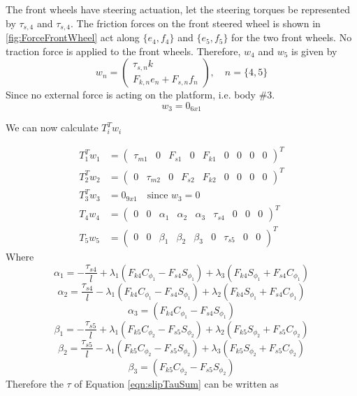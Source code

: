 {The front wheels have steering actuation, let the steering  torques be represented by $\tau_{s,4}$ and  $\tau_{s,4}$. The friction forces on the front steered wheel is shown in \ref{fig:ForceFrontWheel} act along $\{e_4,f_4\}$ and $\{e_5,f_5\}$ for the two front wheels. No traction force is applied to the front wheels. Therefore, $w_4$ and $w_5$ is given by
\[ w_n=\begin{pmatrix}
\tau_{s,n}k\\
F_{k,n}e_n+F_{s,n}f_n
\end{pmatrix},  \quad n=\{4,5\}\]
Since no external force is acting on the platform, i.e. body \#3. \[w_3=0_{6x1}\]

We can now calculate $T_i^Tw_i$

\begin{subequations}
	\label{eqn:slip_Tau_is}
	\begin{align}
	T_1^T w_1&=\begin{pmatrix}
	\tau_{m1} & 0 & F_{s1}& 0& F_{k1}&0&0&0&0
	\end{pmatrix} ^T\\
	T_2^T w_2&=\begin{pmatrix}
	0&\tau_{m2}& 0&F_{s2}&  F_{k2}&0&0&0&0
	\end{pmatrix} ^T\\
	T_3^T w_3&=0_{9x1} \quad \text{since } w_3=0\\
	T_4w_4&= \begin{pmatrix}
	0 & 0& \alpha_1& \alpha_2 & \alpha_3 &\tau_{s4}& 0&0 &0
	\end{pmatrix}^T\\
	T_5w_5&=\begin{pmatrix}
	0 & 0& \beta_1& \beta_2 & \beta_3 &0 &\tau_{s5}& 0&0
	\end{pmatrix}^T
	\end{align}
\end{subequations}
Where 
\[\alpha_1=-\frac{\tau_{s4}}{l}+\lambda_1(F_{k4}C_{\phi_1}-F_{s4}S_{\phi_1})+\lambda_3(F_{k4}S_{\phi_1}+F_{s4}C_{\phi_1})\]
\[\alpha_2=\frac{\tau_{s4}}{l}-\lambda_1(F_{k4}C_{\phi_1}-F_{s4}S_{\phi_1})+\lambda_2(F_{k4}S_{\phi_1}+F_{s4}C_{\phi_1})\]
\[\alpha_3=(F_{k4}C_{\phi_1}-F_{s4}S_{\phi_1})\]
\[\beta_1=-\frac{\tau_{s5}}{l}+\lambda_1(F_{k5}C_{\phi_2}-F_{s5}S_{\phi_2})+\lambda_2(F_{k5}S_{\phi_2}+F_{s5}C_{\phi_2})\]
\[\beta_2=\frac{\tau_{s5}}{l}-\lambda_1(F_{k5}C_{\phi_2}-F_{s5}S_{\phi_2})+\lambda_3(F_{k5}S_{\phi_2}+F_{s5}C_{\phi_2})\]
\[\beta_3=(F_{k5}C_{\phi_2}-F_{s5}S_{\phi_2})\]
Therefore the $\tau$ of Equation \ref{eqn:slipTauSum} can be written as
\begin{multline}

\end{multline}}
